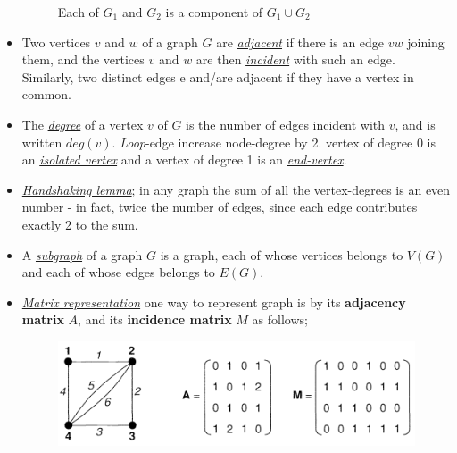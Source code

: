 \documentclass[12pt,a4paper, twocolumn]{article}
\begin{document}
\begin{itemize}
\begin{figure}[h!]
	\caption{Each of $G_1$ and $G_2$ is a component of $G_1 \cup G_2$}
	\end{figure}
\item Two vertices $v$ and $w$ of a graph $G$ are \underline{\emph{\color{magenta} adjacent}} if there is an edge $vw$ joining them, and the vertices $v$ and $w$ are then \underline{\emph{\color{magenta} incident}} with such an edge. Similarly, two distinct edges e and/are adjacent if they have a vertex in common.
\item The \underline{\emph{\color{magenta} degree}} of a vertex $v$ of $G$ is the number of edges incident with $v$, and is written $deg(v)$. \emph{Loop}-edge increase node-degree by 2. vertex of degree 0 is an \underline{\emph{\color{magenta} isolated vertex}} and a vertex of degree 1 is an \underline{\emph{\color{magenta} end-vertex}}.
\item \underline{\emph{\color{magenta}Handshaking lemma}}; in any graph the sum of all the vertex-degrees is an even number - in
fact, twice the number of edges, since each edge contributes exactly 2 to the sum.
\item A \underline{\emph{\color{magenta}subgraph}} of a graph $G$ is a graph, each of whose vertices belongs to $V(G)$ and each
of whose edges belongs to $E(G)$.
\item \underline{\emph{\color{magenta} Matrix representation}} one way to represent graph is by its \textbf{adjacency matrix} $A$, and its \textbf{incidence matrix} $M$ as follows;
	\begin{figure}[h!]
	\centering
	\includegraphics[scale=0.55]{figures/matrixRepresentation.png}
	\end{figure}
\end{itemize}
\newpage
\end{document}
